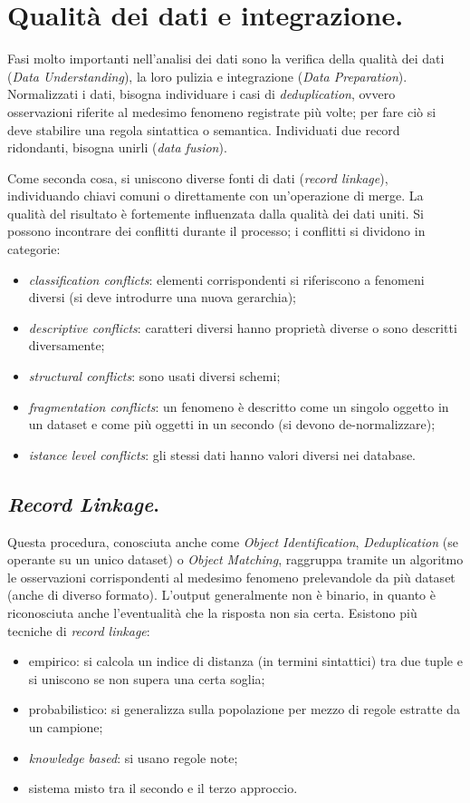 \documentclass[a4page, 11pt]{article}
\begin{document}
\section{Qualità dei dati e integrazione.}
Fasi molto importanti nell'analisi dei dati sono la verifica della qualità dei dati (\textit{Data Understanding}), la loro pulizia e integrazione (\textit{Data Preparation}).
Normalizzati i dati, bisogna individuare i casi di \textit{deduplication}, ovvero osservazioni riferite al medesimo fenomeno registrate più volte; per fare ciò si deve stabilire una regola sintattica o semantica.
Individuati due record ridondanti, bisogna unirli (\textit{data fusion}).

Come seconda cosa, si uniscono diverse fonti di dati (\textit{record linkage}), individuando chiavi comuni o direttamente con un'operazione di merge.
La qualità del risultato è fortemente influenzata dalla qualità dei dati uniti.
Si possono incontrare dei conflitti durante il processo; i conflitti si dividono in categorie:
\begin{itemize}
\item \textit{classification conflicts}: elementi corrispondenti si riferiscono a fenomeni diversi (si deve introdurre una nuova gerarchia);
\item \textit{descriptive conflicts}: caratteri diversi hanno proprietà diverse o sono descritti diversamente;
\item \textit{structural conflicts}: sono usati diversi schemi;
\item \textit{fragmentation conflicts}: un fenomeno è descritto come un singolo oggetto in un dataset e come più oggetti in un secondo (si devono de-normalizzare);
\item \textit{istance level conflicts}: gli stessi dati hanno valori diversi nei database.
\end{itemize}

\subsection{\textit{Record Linkage}.}
Questa procedura, conosciuta anche come \textit{Object Identification}, \textit{Deduplication} (se operante su un unico dataset) o \textit{Object Matching}, raggruppa tramite un algoritmo le osservazioni corrispondenti al medesimo fenomeno prelevandole da più dataset (anche di diverso formato).
L'output generalmente non è binario, in quanto è riconosciuta anche l'eventualità che la risposta non sia certa.
Esistono più tecniche di \textit{record linkage}:
\begin{itemize}
\item empirico: si calcola un indice di distanza (in termini sintattici) tra due tuple e si uniscono se non supera una certa soglia;
\item probabilistico: si generalizza sulla popolazione per mezzo di regole estratte da un campione;
\item \textit{knowledge based}: si usano regole note;
\item sistema misto tra il secondo e il terzo approccio.
\end{itemize}
\end{document}
